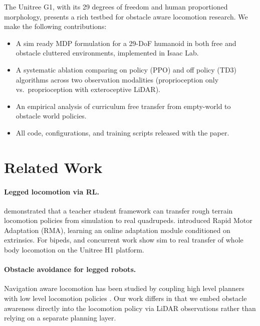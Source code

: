 \documentclass{article}
\begin{document}
The Unitree G1, with its 29 degrees of freedom and human proportioned
morphology, presents a rich testbed for obstacle aware locomotion research.
We make the following contributions:

\begin{itemize}
  \item A sim ready MDP formulation for a 29-DoF humanoid in both free and
        obstacle cluttered environments, implemented in Isaac Lab.
  \item A systematic ablation comparing on policy (PPO) and off policy (TD3)
        algorithms across two observation modalities (proprioception only vs.\
        proprioception with exteroceptive LiDAR).
  \item An empirical analysis of curriculum free transfer from empty-world to
        obstacle world policies.
  \item All code, configurations, and training scripts released with the paper.
\end{itemize}

\section{Related Work}

\paragraph{Legged locomotion via RL.}
\citet{lee2020learning} demonstrated that a teacher student framework can
transfer rough terrain locomotion policies from simulation to real quadrupeds.
\citet{kumar2021rma} introduced Rapid Motor Adaptation (RMA), learning an
online adaptation module conditioned on extrinsics.
For bipeds, \citet{radosavovic2024humanoid} and concurrent work show
sim to real transfer of whole body locomotion on the Unitree H1 platform.

\paragraph{Obstacle avoidance for legged robots.}
Navigation aware locomotion has been studied by coupling high level planners
with low level locomotion policies
\cite{hoeller2024anymal,zhuang2023robot}.
Our work differs in that we embed obstacle awareness directly into the
locomotion policy via LiDAR observations rather than relying on a separate
planning layer.
\end{document}
